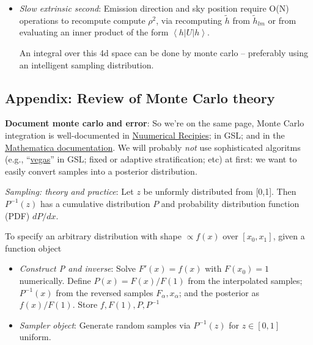 \documentclass[twocolumn,prd,nofootinbib]{revtex4}
\newcommand\qmoperatorelement[3]{\left\langle#1\left|#2\right|#3\right\rangle}
\begin{document}
\begin{widetext}
{\begin{itemize}
\begin{shaded}
    Given these two terms, we compute an ``easy'' integral,
where every term in the integrand can be computed from a quick interpolation over a well-sampled, low-dimensional function:
\begin{eqnarray}
L_{red,EZ} \equiv \int \frac{dt}{T_{\rm window}} \frac{d\psi}{\pi} \frac{dr}{r_{\rm max}^3/3}e^{\ln  L}
\end{eqnarray}
\end{shaded}

\item \emph{Slow extrinsic second}: Emission direction and sky position require O(N) operations to recompute compute
  $\rho^2$, via recomputing $\tilde{h}$ from $\tilde{h}_{lm}$ or from evaluating an inner product of the form
  $\qmoperatorelement{h}{U}{h}$.    

An integral over this 4d space can be done by monte carlo -- preferably using an intelligent sampling distribution.

\end{itemize}
}



\subsection{Appendix: Review of Monte Carlo theory}

\noindent \textbf{Document monte carlo and error}: So we're on the same page, Monte Carlo integration is well-documented in \href{http://nr.com}{Nuumerical Recipies}; in
GSL; and in the \href{http://reference.wolfram.com/mathematica/tutorial/NIntegrateIntegrationStrategies.html}{Mathematica documentation}.  We will probably \emph{not} use sophisticated algoritms (e.g.,
``\href{http://www.gnu.org/software/gsl/manual/html_node/VEGAS.html#VEGAS}{vegas}'' in GSL; fixed or adaptive stratification; etc) at first: we want to easily convert samples into a posterior distribution.


\emph{Sampling: theory and practice}: Let $z$ be unformly distributed from [0,1]. Then $P^{-1}(z)$ has a cumulative distribution $P$
and probability distribution function (PDF) $dP/dx$.  

To specify an arbitrary distribution with shape $\propto f(x)$ over $[x_0,x_1]$, given a function object
\begin{itemize}
\item \emph{Construct P and inverse}: Solve $F'(x)=f(x)$ with $F(x_0)=1$ numerically.  Define $P(x)=F(x)/F(1)$ from the
  interpolated samples; $P^{-1}(x)$ from the reversed samples $F_\alpha,x_\alpha$; and the posterior as $f(x)/F(1)$.
  Store $f,F(1), P,P^{-1}$
\item \emph{Sampler object}: Generate random samples via $P^{-1}(z)$ for $z\in[0,1]$ uniform.


\end{itemize}
\end{widetext}
\end{document}
